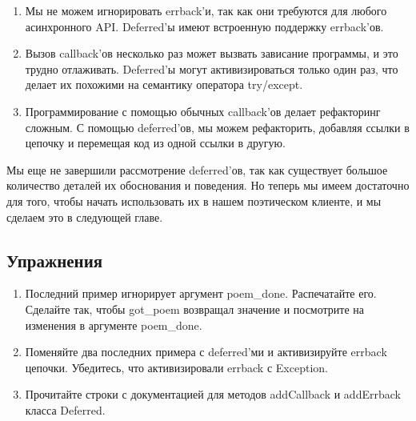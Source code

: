 \begin{enumerate}
\item Мы не можем игнорировать errback'и, так как они требуются 
для любого асинхронного API. Deferred'ы имеют встроенную поддержку errback'ов.  

\item Вызов callback'ов несколько раз может вызвать зависание программы, и 
это трудно отлаживать. Deferred'ы могут активизироваться только один 
раз, что делает их похожими на семантику оператора try/except.

\item Программирование с помощью обычных callback'ов делает 
рефакторинг сложным. С помощью deferred'ов, мы можем рефакторить, 
добавляя ссылки в цепочку и перемещая код из одной 
ссылки в другую.

\end{enumerate}

Мы еще не завершили рассмотрение deferred'ов, так как существует 
большое количество деталей их обоснования и поведения. Но теперь 
мы имеем достаточно для того, чтобы начать использовать 
их в нашем поэтическом клиенте, и мы сделаем это 
в следующей главе.

\subsection{Упражнения}

\begin{enumerate}
\item Последний пример игнорирует аргумент poem\_done. Распечатайте его. 
Сделайте так, чтобы got\_poem возвращал значение и посмотрите на изменения в 
аргументе poem\_done.

\item Поменяйте два последних примера с deferred'ми и активизируйте errback цепочки. 
Убедитесь, что активизировали errback с Exception.  

\item Прочитайте строки с документацией для методов addCallback и addErrback  
класса Deferred. 

\end{enumerate}
